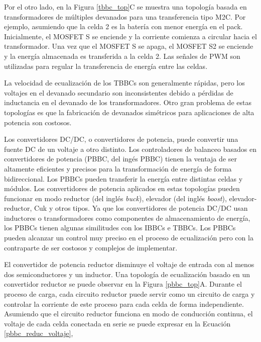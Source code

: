\documentclass[10pt,a4paper]{article}
\newcounter{subsubsubsection}[subsubsection]
\begin{document}
Por el otro lado, en la Figura \ref{tbbc_top}C se muestra una topolog\'ia basada
en transformadores de m\'ultiples devanados para una transferencia tipo
\acrshort{M2C}. Por ejemplo, asumiendo que la celda 2 es la bater\'ia con menor 
energ\'ia en el pack. Inicialmente, el MOSFET S se enciende y la corriente 
comienza a circular hacia el transformador. Una vez que el MOSFET S se apaga, el
MOSFET S2 se enciende y la energ\'ia almacenada es transferida a la celda 2. Las
señales de \acrshort{PWM} son utilizadas para regular la transferencia de
energ\'ia entre las celdas.

La velocidad de ecualizaci\'on de los \acrshort{TBBC}s son generalmente
r\'apidas, pero los voltajes en el devanado secundario son inconsistentes debido
a p\'erdidas de inductancia en el devanado de los transformadores. Otro gran
problema de estas topolog\'ias es que la fabricaci\'on de devanados sim\'etricos
para aplicaciones de alta potencia son costosos.


Los convertidores DC/DC, o convertidores de potencia, puede convertir una fuente
DC de un voltaje a otro distinto. Los controladores de balanceo basados en
convertidores de potencia (\acrshort{PBBC}, del ing\'es \acrlong{PBBC}) tienen
la ventaja de ser altamente eficientes y precisos para la transformaci\'on de
energ\'ia de forma bidireccional. Los \acrshort{PBBC}s pueden transferir la
energ\'ia entre distintas celdas y m\'odulos. Los convertidores de potencia
aplicados en estas topolog\'ias pueden funcionar en modo reductor (del ingl\'es
\emph{buck}), elevador (del ingl\'es \emph{boost}), elevador-reductor, Cuk y
otros tipos. Ya que los convertidores de potencia DC/DC usan inductores o
transformadores como componentes de almacenamiento de energ\'ia, los
\acrshort{PBBC}s tienen algunas similitudes con los \acrshort{IBBC}s e
\acrshort{TBBC}s. Los \acrshort{PBBC}s pueden alcanzar un control muy preciso en 
el proceso de ecualizaci\'on pero con la contraparte de ser costosos y complejos 
de implementar.

El convertidor de potencia reductor disminuye el voltaje de entrada con al menos
dos semiconductores y un inductor. Una topolog\'ia de ecualizaci\'on basado en
un convertidor reductor se puede observar en la Figura \ref{pbbc_top}A. Durante
el proceso de carga, cada circuito reductor puede servir como un circuito de
carga y controlar la corriente de este proceso para cada celda de forma 
independiente. Asumiendo que el circuito reductor funciona en modo de 
conducci\'on continua, el voltaje de cada celda conectada en serie se puede 
expresar en la Ecuaci\'on \ref{pbbc_reduc_voltaje},
\end{document}
